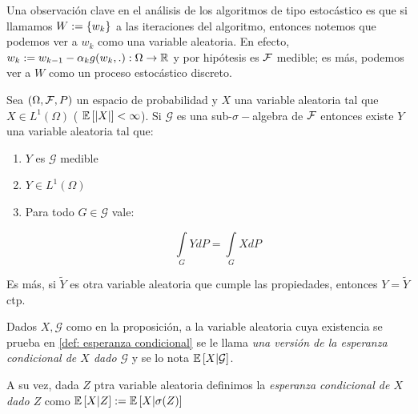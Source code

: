 \begin{remark}
	Una observaci\'on clave en el an\'alisis de los algoritmos de tipo estoc\'astico es que si llamamos ${W} := \left\lbrace w_k\right\rbrace$ a las iteraciones del algoritmo, entonces notemos que podemos ver a $w_k$ como una variable aleatoria. En efecto, $w_k := w_{k-1} - \alpha_k g(w_k, .) : \Omega \rightarrow {\mathbb{R}}$ y por hip\'otesis es $\mathcal{F}$ medible; es m\'as, podemos ver a $W$ como un proceso estoc\'astico discreto.
\end{remark}

\begin{proposition}
	\label{def: esperanza condicional}
	Sea $\left(\Omega, \mathcal{F}, P\right)$ un espacio de probabilidad y $X$ una variable aleatoria tal que $X \in L^1(\Omega)$ ( \Eg $\mathbb{E} \left[\left\lvert X\right\rvert\right] < \infty$). Si $\mathcal{G}$ es una sub-$\sigma-$algebra de $\mathcal{F}$ entonces existe $Y$ una variable aleatoria tal que:
	
	\begin{enumerate}
		\item $Y$ es $\mathcal{G}$ medible
		\item $Y \in L^1(\Omega)$
		\item Para todo $G \in \mathcal{G}$ vale:
		
		\begin{equation*}
			\int\limits_{G} {Y dP} = \int\limits_{G} {X dP}
		\end{equation*}
	\end{enumerate}

	Es m\'as, si $\widetilde{Y}$ es otra variable aleatoria que cumple las propiedades, entonces $Y = \widetilde{Y}$ ctp.
	
\end{proposition}

\begin{definition}
	Dados $X,\mathcal{G}$ como en la proposici\'on, a la variable aleatoria cuya existencia se prueba en \ref{def: esperanza condicional} se le llama \textit{una versi\'on de la esperanza condicional de $X$ dado $\mathcal{G}$} y se lo nota $\mathbb{E} \left[X \vert \mathcal{G}\right]$.
	
	A su vez, dada $Z$ ptra variable aleatoria definimos la \textit{esperanza condicional de $X$ dado $Z$} como $\mathbb{E} \left[X \vert Z\right] := \mathbb{E} \left[X \vert \sigma(Z)\right]$
	
\end{definition}

